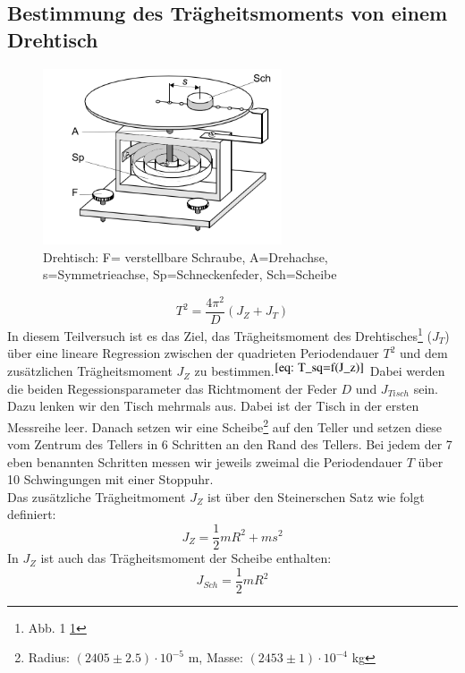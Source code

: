 \documentclass[bibliography=totocnumbered]{scrartcl}
\begin{document}
	\subsection{Bestimmung des Trägheitsmoments von einem Drehtisch}
	\begin{figure}[!ht]
		\centering									%
		\includegraphics[width=200pt]{fotos/gpr1/Drehtisch.png}			%
		\caption{Drehtisch: F= verstellbare Schraube, A=Drehachse, s=Symmetrieachse, Sp=Schneckenfeder, Sch=Scheibe }							%
		\label{Abb.: Drehtisch}							%
	\end{figure}
\begin{equation}\label{eq: T_sq=f(J_z)}
	T^{2}=\dfrac{4\pi^{2}}{D}\left(J_{Z}+J_{T}\right)
\end{equation}
	In diesem Teilversuch ist es das Ziel, das Trägheitsmoment des Drehtisches\footnote{Abb. 1 \ref{Abb.: Drehtisch}} ($ J_{T} $) über eine lineare Regression zwischen der quadrieten Periodendauer $ T^{2} $ und dem zusätzlichen Trägheitsmoment $ J_{Z} $ zu bestimmen.$ ^{\ref{eq: T_sq=f(J_z)}} $ Dabei werden die beiden Regessionsparameter das Richtmoment der Feder $ D $ und $ J_{Tisch} $ sein. Dazu lenken wir den Tisch mehrmals aus. Dabei ist der Tisch in der ersten Messreihe leer. Danach setzen wir eine Scheibe\footnote{Radius: $ (2405\pm2.5)\cdot 10^{-5} $ m, Masse: $ (2453\pm1)\cdot 10^{-4} $ kg} auf den Teller und setzen diese vom Zentrum des Tellers in 6 Schritten an den Rand des Tellers. Bei jedem der 7 eben benannten Schritten messen wir jeweils zweimal die Periodendauer $ T $ über 10 Schwingungen mit einer Stoppuhr. \\
	Das zusätzliche Trägheitmoment $ J_{Z} $ ist über den Steinerschen Satz wie folgt definiert:
	\begin{equation}\label{eq: J_Z1}
		J_{Z}=\dfrac{1}{2}mR^{2}+ms^{2}
	\end{equation}
In $ J_{Z} $ ist auch das Trägheitsmoment der Scheibe enthalten:
\begin{equation}\label{eq: J_sch}
	J_{Sch}=\dfrac{1}{2}mR^{2}
\end{equation}
\end{document}

